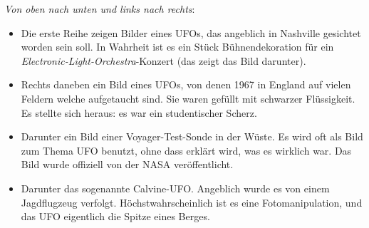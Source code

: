 \documentclass{scrartcl}
\begin{document}
\textit{Von oben nach unten und links nach rechts}:

\begin{itemize}
	\item Die erste Reihe zeigen Bilder eines UFOs, das angeblich in Nashville gesichtet worden sein soll. In Wahrheit ist es ein Stück Bühnendekoration für ein \textit{Electronic-Light-Orchestra}-Konzert (das zeigt das Bild darunter).
	\item Rechts daneben ein Bild eines UFOs, von denen 1967 in England auf vielen Feldern welche aufgetaucht sind. Sie waren gefüllt mit schwarzer Flüssigkeit. Es stellte sich heraus: es war ein studentischer Scherz.
	\item Darunter ein Bild einer Voyager-Test-Sonde in der Wüste. Es wird oft als Bild zum Thema UFO benutzt, ohne dass erklärt wird, was es wirklich war. Das Bild wurde offiziell von der NASA veröffentlicht.
	\item Darunter das sogenannte Calvine-UFO. Angeblich wurde es von einem Jagdflugzeug verfolgt. Höchstwahrscheinlich ist es eine Fotomanipulation, und das UFO eigentlich die Spitze eines Berges.
\end{itemize}
\end{document}

